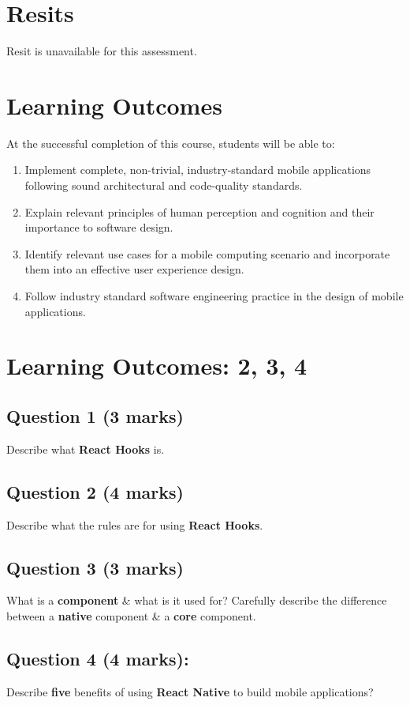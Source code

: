 \documentclass{article}
\begin{document}
\section*{Resits} 
Resit is unavailable for this assessment.

\section*{Learning Outcomes}
At the successful completion of this course, students will be able to:
\begin{enumerate}
	\item Implement complete, non-trivial, industry-standard mobile applications following sound architectural and code-quality standards.
	\item Explain relevant principles of human perception and cognition and their importance to software design.
	\item Identify relevant use cases for a mobile computing scenario and incorporate them into an effective user experience design.
	\item Follow industry standard software engineering practice in the design of mobile applications.
\end{enumerate}

\newpage

\section*{Learning Outcomes: 2, 3, 4}

\subsection*{Question 1 (3 marks)}
Describe what \textbf{React Hooks} is.

\subsection*{Question 2 (4 marks)}
Describe what the rules are for using \textbf{React Hooks}.

\subsection*{Question 3 (3 marks)}
What is a \textbf{component} \& what is it used for? Carefully describe the difference between a \textbf{native} component \& a \textbf{core} component.

\subsection*{Question 4 (4 marks):}
Describe \textbf{five} benefits of using \textbf{React Native} to build mobile applications?
\end{document}
